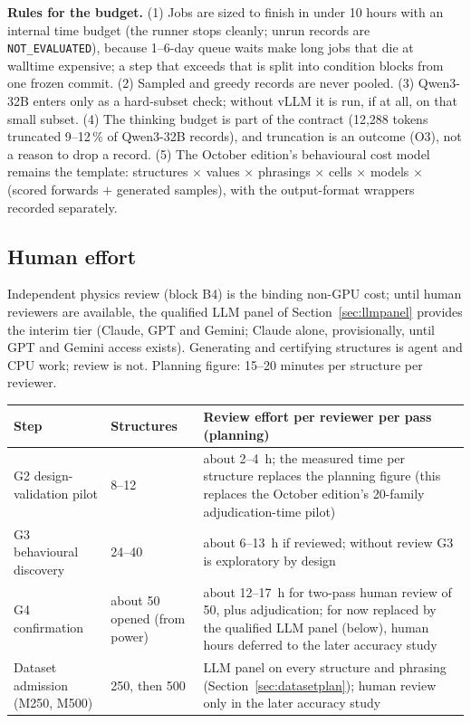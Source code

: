 \documentclass[10pt,a4paper]{article}
\newcommand{\NE}{\texttt{NOT\_EVALUATED}}
\begin{document}
\textbf{Rules for the budget.} (1) Jobs are sized to finish in under 10 hours with an internal time budget (the
runner stops cleanly; unrun records are \NE{}), because 1--6-day queue waits make long jobs that die at walltime
expensive; a step that exceeds that is split into condition blocks from one frozen commit. (2) Sampled and greedy
records are never pooled. (3) Qwen3-32B enters only as a hard-subset check; without vLLM it is run, if at all, on
that small subset. (4) The thinking budget is part of the contract (12{,}288 tokens truncated 9--12\,\% of
Qwen3-32B records), and truncation is an outcome (O3), not a reason to drop a record. (5) The October edition's
behavioural cost model remains the template: structures $\times$ values $\times$ phrasings $\times$ cells $\times$
models $\times$ (scored forwards $+$ generated samples), with the output-format wrappers recorded separately.

\subsection{Human effort}
\label{sec:compute-human}

Independent physics review (block B4) is the binding non-GPU cost; until human reviewers are available, the
qualified LLM panel of Section~\ref{sec:llmpanel} provides the interim tier (Claude, GPT and Gemini; Claude alone, provisionally, until GPT and Gemini access exists). Generating and certifying
structures is agent and CPU work; review is not. Planning figure: 15--20 minutes per structure per reviewer.

\begin{center}\small
\begin{tabularx}{\linewidth}{@{}P{3.6cm}P{2.4cm}L@{}}
\toprule
Step & Structures & Review effort per reviewer per pass (planning) \\
\midrule
G2 design-validation pilot & 8--12 & about 2--4~h; the measured time per structure replaces the planning figure
(this replaces the October edition's 20-family adjudication-time pilot) \\
G3 behavioural discovery & 24--40 & about 6--13~h if reviewed; without review G3 is exploratory by design \\
G4 confirmation & about 50 opened (from power) & about 12--17~h for two-pass human review of 50, plus adjudication; for now
replaced by the qualified LLM panel (below), human hours deferred to the later accuracy study \\
Dataset admission (M250, M500) & 250, then 500 & LLM panel on every structure and phrasing (Section~\ref{sec:datasetplan}); human review only in the later accuracy study \\
\bottomrule
\end{tabularx}
\end{center}
\end{document}
